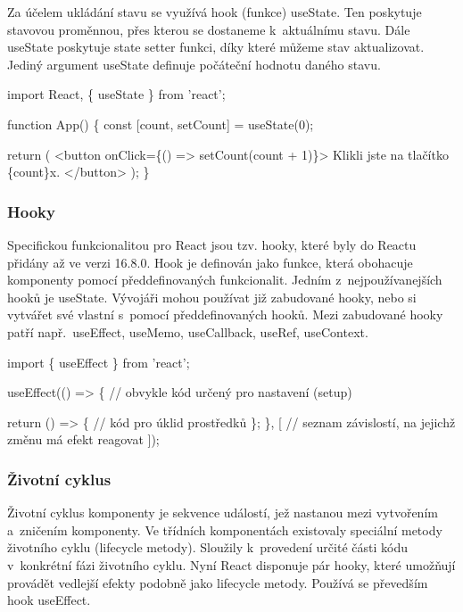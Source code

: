 Za účelem ukládání stavu se využívá hook (funkce) useState. Ten poskytuje stavovou proměnnou, přes kterou se dostaneme k~aktuálnímu stavu. 
Dále useState poskytuje state setter funkci, díky které můžeme stav aktualizovat. Jediný argument useState definuje počáteční hodnotu daného stavu.\cite{reactitnetwork,react}

\begin{prog}
import React, \{ useState \} from 'react';

function App() \{
  const [count, setCount] = useState(0);

  return (
    <button onClick=\{() => setCount(count + 1)\}>
      Klikli jste na tlačítko \{count\}x.
    </button>
  );
\}
\end{prog}

\subsubsection{Hooky}

Specifickou funkcionalitou pro React jsou tzv. hooky, které byly do Reactu přidány až ve verzi 16.8.0.\cite{reactgithub} 
Hook je definován jako funkce, která obohacuje komponenty pomocí předdefinovaných funkcionalit. Jedním z~nejpoužívanejších hooků je useState. 
Vývojáři mohou používat již zabudované hooky, nebo si vytvářet své vlastní s~pomocí předdefinovaných hooků. 
Mezi zabudované hooky patří např.~useEffect, useMemo, useCallback, useRef, useContext.\cite{react}

\begin{prog}
import \{ useEffect \} from 'react';

useEffect(() => \{
  // obvykle kód určený pro nastavení (setup)

  return () => \{
    // kód pro úklid prostředků
  \};
\}, [
  // seznam závislostí, na jejichž změnu má efekt reagovat
]);
\end{prog}

\subsubsection{Životní cyklus}

Životní cyklus komponenty je sekvence událostí, jež nastanou mezi vytvořením a~zničením komponenty. 
Ve třídních komponentách existovaly speciální metody životního cyklu (lifecycle metody). Sloužily k~provedení určité části kódu v~konkrétní fázi životního cyklu.  
Nyní React disponuje pár hooky, které umožňují provádět vedlejší efekty podobně jako lifecycle metody. Používá se převedším hook useEffect.

